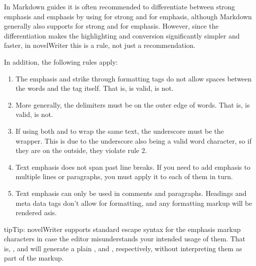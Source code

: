 \documentclass[a4paper,11pt,english]{sphinxmanual}
\begin{document}
\sphinxAtStartPar
In Markdown guides it is often recommended to differentiate between strong emphasis and emphasis
by using \sphinxcode{\sphinxupquote{**}} for strong and \sphinxcode{\sphinxupquote{\_}} for emphasis, although Markdown generally also supports \sphinxcode{\sphinxupquote{\_\_}}
for strong and \sphinxcode{\sphinxupquote{*}} for emphasis. However, since the differentiation makes the highlighting and
conversion significantly simpler and faster, in novelWriter this is a rule, not just a
recommendation.

\sphinxAtStartPar
In addition, the following rules apply:
\begin{enumerate}
%
\item {} 
\sphinxAtStartPar
The emphasis and strike through formatting tags do not allow spaces between the words and the
tag itself. That is,  is valid,  is not.

\item {} 
\sphinxAtStartPar
More generally, the delimiters must be on the outer edge of words. That is,  is valid,  is not.

\item {} 
\sphinxAtStartPar
If using both \sphinxcode{\sphinxupquote{**}} and \sphinxcode{\sphinxupquote{\_}} to wrap the same text, the underscore must be the 
wrapper. This is due to the underscore also being a valid word character, so if they are on the
outside, they violate rule 2.

\item {} 
\sphinxAtStartPar
Text emphasis does not span past line breaks. If you need to add emphasis to multiple lines or
paragraphs, you must apply it to each of them in turn.

\item {} 
\sphinxAtStartPar
Text emphasis can only be used in comments and paragraphs. Headings and meta data tags don’t
allow for formatting, and any formatting markup will be rendered as\sphinxhyphen{}is.

\end{enumerate}

\begin{sphinxadmonition}{tip}{Tip:}
\sphinxAtStartPar
novelWriter supports standard escape syntax for the emphasis markup characters in case the
editor misunderstands your intended usage of them. That is, \sphinxcode{\sphinxupquote{\textbackslash{}*}}, \sphinxcode{\sphinxupquote{\textbackslash{}\_}} and \sphinxcode{\sphinxupquote{\textbackslash{}\textasciitilde{}}} will
generate a plain \sphinxcode{\sphinxupquote{*}}, \sphinxcode{\sphinxupquote{\_}} and \sphinxcode{\sphinxupquote{\textasciitilde{}}}, respectively, without interpreting them as part of the
markup.
\end{sphinxadmonition}
\end{document}
